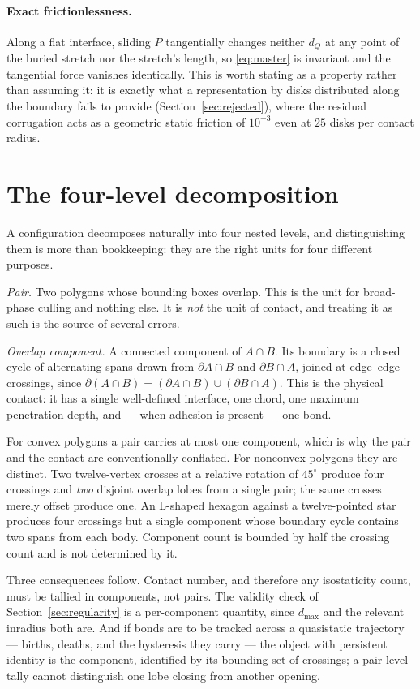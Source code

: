 \documentclass[11pt]{article}
\begin{document}
\paragraph{Exact frictionlessness.} Along a flat interface, sliding $P$ tangentially changes neither $d_Q$ at any point of the buried stretch nor the stretch's length, so \eqref{eq:master} is invariant and the tangential force vanishes identically. This is worth stating as a property rather than assuming it: it is exactly what a representation by disks distributed along the boundary fails to provide (Section~\ref{sec:rejected}), where the residual corrugation acts as a geometric static friction of $10^{-3}$ even at $25$ disks per contact radius.

\section{The four-level decomposition}
\label{sec:levels}

A configuration decomposes naturally into four nested levels, and distinguishing them is more than bookkeeping: they are the right units for four different purposes.

\emph{Pair.} Two polygons whose bounding boxes overlap. This is the unit for broad-phase culling and nothing else. It is \emph{not} the unit of contact, and treating it as such is the source of several errors.

\emph{Overlap component.} A connected component of $A\cap B$. Its boundary is a closed cycle of alternating spans drawn from $\partial A\cap B$ and $\partial B\cap A$, joined at edge--edge crossings, since $\partial(A\cap B) = (\partial A\cap B)\cup(\partial B\cap A)$. This is the physical contact: it has a single well-defined interface, one chord, one maximum penetration depth, and --- when adhesion is present --- one bond.

For convex polygons a pair carries at most one component, which is why the pair and the contact are conventionally conflated. For nonconvex polygons they are distinct. Two twelve-vertex crosses at a relative rotation of $45^\circ$ produce four crossings and \emph{two} disjoint overlap lobes from a single pair; the same crosses merely offset produce one. An L-shaped hexagon against a twelve-pointed star produces four crossings but a single component whose boundary cycle contains two spans from each body. Component count is bounded by half the crossing count and is not determined by it.

Three consequences follow. Contact number, and therefore any isostaticity count, must be tallied in components, not pairs. The validity check of Section~\ref{sec:regularity} is a per-component quantity, since $d_{\max}$ and the relevant inradius both are. And if bonds are to be tracked across a quasistatic trajectory --- births, deaths, and the hysteresis they carry --- the object with persistent identity is the component, identified by its bounding set of crossings; a pair-level tally cannot distinguish one lobe closing from another opening.
\end{document}
